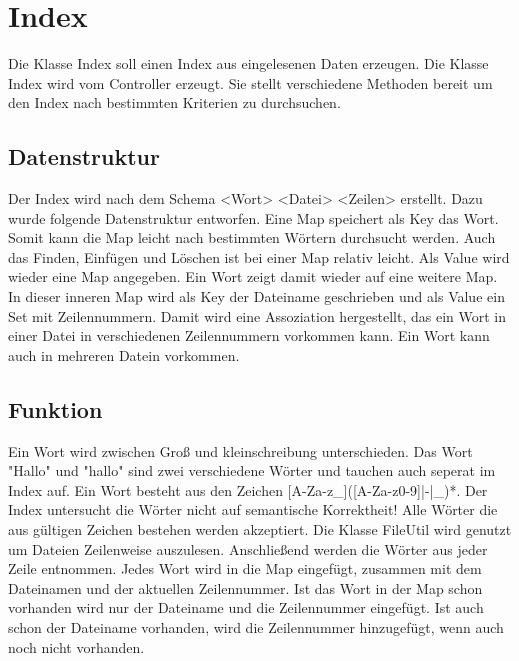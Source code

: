 \section{Index}
Die Klasse Index soll einen Index aus eingelesenen Daten erzeugen. Die Klasse Index wird vom Controller erzeugt. Sie stellt verschiedene Methoden bereit um den Index nach bestimmten Kriterien zu durchsuchen.
\subsection{Datenstruktur}
Der Index wird nach dem Schema <Wort> <Datei> <Zeilen> erstellt. Dazu wurde folgende Datenstruktur entworfen.
Eine Map speichert als Key das Wort. Somit kann die Map leicht nach bestimmten Wörtern durchsucht werden. Auch das Finden, Einfügen und Löschen ist bei einer Map relativ leicht. Als Value wird wieder eine Map angegeben. Ein Wort zeigt damit wieder auf eine weitere Map. In dieser inneren Map  wird als Key der Dateiname geschrieben und als Value ein Set mit Zeilennummern. Damit wird eine Assoziation hergestellt, das ein Wort in einer Datei in verschiedenen Zeilennummern vorkommen kann. Ein Wort kann auch in mehreren Datein vorkommen.
\subsection{Funktion}
Ein Wort wird zwischen Groß und kleinschreibung unterschieden. Das Wort "Hallo" und "hallo" sind zwei verschiedene Wörter und tauchen auch seperat im Index auf.
Ein Wort besteht aus den Zeichen [A-Za-z_]([A-Za-z0-9]|-|_)*.
Der Index untersucht die Wörter nicht auf semantische Korrektheit! Alle Wörter die aus gültigen Zeichen bestehen werden akzeptiert. Die Klasse FileUtil wird genutzt um Dateien Zeilenweise auszulesen. Anschließend werden die Wörter aus jeder Zeile entnommen. Jedes Wort wird in die Map eingefügt, zusammen mit dem Dateinamen und der aktuellen Zeilennummer. Ist das Wort in der Map schon vorhanden wird nur der Dateiname und die Zeilennummer eingefügt. Ist auch schon der Dateiname vorhanden, wird die Zeilennummer hinzugefügt, wenn auch noch nicht vorhanden.